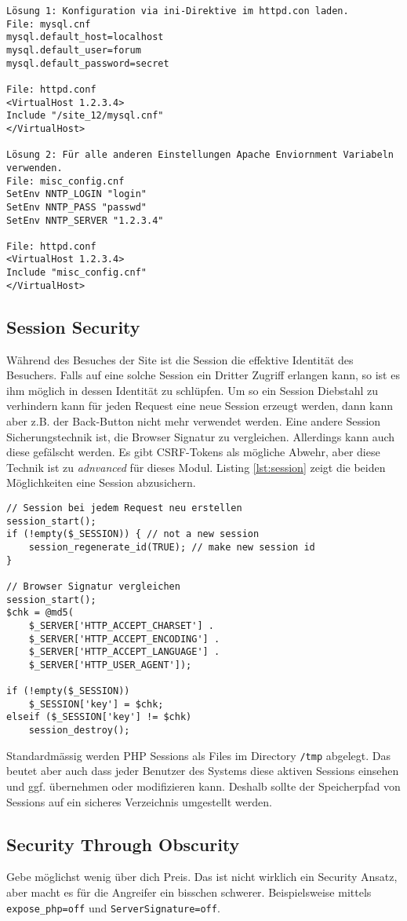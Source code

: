 \begin{lstlisting}[caption=Konfigurationen]
Lösung 1: Konfiguration via ini-Direktive im httpd.con laden.
File: mysql.cnf
mysql.default_host=localhost
mysql.default_user=forum
mysql.default_password=secret

File: httpd.conf
<VirtualHost 1.2.3.4>
Include "/site_12/mysql.cnf"
</VirtualHost>

Lösung 2: Für alle anderen Einstellungen Apache Enviornment Variabeln verwenden.
File: misc_config.cnf
SetEnv NNTP_LOGIN "login"
SetEnv NNTP_PASS "passwd"
SetEnv NNTP_SERVER "1.2.3.4"

File: httpd.conf
<VirtualHost 1.2.3.4>
Include "misc_config.cnf"
</VirtualHost>
\end{lstlisting}


\subsection{Session Security}

Während des Besuches der Site ist die Session die effektive Identität des Besuchers. Falls auf eine solche Session ein Dritter Zugriff erlangen kann, so ist es ihm möglich in dessen Identität zu schlüpfen. Um so ein Session Diebstahl zu verhindern kann für jeden Request eine neue Session erzeugt werden, dann kann aber z.B. der Back-Button nicht mehr verwendet werden. Eine andere Session Sicherungstechnik ist, die Browser Signatur zu vergleichen. Allerdings kann auch diese gefälscht werden. Es gibt CSRF-Tokens als mögliche Abwehr, aber diese Technik ist zu \textit{adnvanced} für dieses Modul. Listing \ref{lst:session} zeigt die beiden Möglichkeiten eine Session abzusichern.

\begin{lstlisting}[caption=Session absichern, label=lst:session]
// Session bei jedem Request neu erstellen
session_start();
if (!empty($_SESSION)) { // not a new session
	session_regenerate_id(TRUE); // make new session id
}

// Browser Signatur vergleichen
session_start();
$chk = @md5(
	$_SERVER['HTTP_ACCEPT_CHARSET'] .
	$_SERVER['HTTP_ACCEPT_ENCODING'] .
	$_SERVER['HTTP_ACCEPT_LANGUAGE'] .
	$_SERVER['HTTP_USER_AGENT']);

if (!empty($_SESSION))
	$_SESSION['key'] = $chk;
elseif ($_SESSION['key'] != $chk)
	session_destroy();
\end{lstlisting}

Standardmässig werden PHP Sessions als Files im Directory \verb|/tmp| abgelegt. Das beutet aber auch dass jeder Benutzer des Systems diese aktiven Sessions einsehen und ggf. übernehmen oder modifizieren kann. Deshalb sollte der Speicherpfad von Sessions auf ein sicheres Verzeichnis umgestellt werden.

\subsection{Security Through Obscurity}
Gebe möglichst wenig über dich Preis. Das ist nicht wirklich ein Security Ansatz, aber macht es für die Angreifer ein bisschen schwerer. Beispielsweise mittels \verb|expose_php=off| und \verb|ServerSignature=off|.